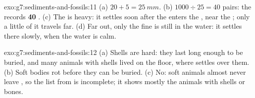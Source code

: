 \begin{solution}{exo:g7:sediments-and-fossils:11}
(a) $20 + 5 = \qty{25}{mm}$. (b) $1000 \div 25 = 40$ pairs: the 
records \textbf{40 }. (c) The  is heavy: it settles soon after
the  enters the , near the ; only a little of it travels
far. (d) Far out, only the fine  is still in the water: it settles
there slowly, when the water is calm.
\end{solution}

\begin{solution}{exo:g7:sediments-and-fossils:12}
(a) Shells are hard: they last long enough to be buried, and many
animals with shells lived on the  floor, where  settles over them.
(b) Soft bodies rot before they can be buried. (c) No: soft animals
almost never leave , so the list from  is incomplete; it
shows mostly the animals with shells or bones.
\end{solution}

